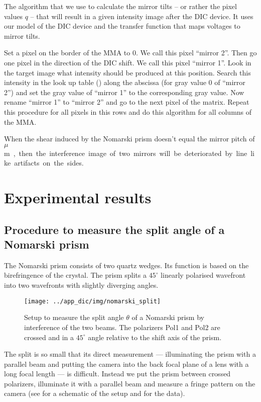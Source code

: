 The algorithm that we use to calculate the mirror tilts -- or rather
the pixel values $q$ -- that will result in a given intensity image
after the DIC device. It uses our model of the DIC device and the
transfer function that maps voltages to mirror tilts.

Set a pixel on the border of the MMA to 0. We call this pixel ``mirror
2''. Then go one pixel in the direction of the DIC shift. We call this
pixel ``mirror 1''. Look in the target image what intensity should be
produced at this position. Search this intensity in the look up table
() along the abscissa (for gray value 0 of
``mirror 2'') and set the gray value of ``mirror 1'' to the
corresponding gray value. Now rename ``mirror 1'' to ``mirror 2'' and
go to the next pixel of the matrix. Repeat this procedure for all
pixels in this rows and do this algorithm for all columns of the MMA.

When the shear induced by the Nomarski prism doesn't equal the mirror
pitch of \unit[16]{$\mu$m}, then the interference image of two
mirrors will be deteriorated by line like artifacts on the sides.

\section{Experimental results}
\subsection{Procedure to measure the split angle of a Nomarski prism}
\label{sec:prism}
The Nomarski prism consists of two quartz wedges. Its function is
based on the birefringence of the crystal. The prism splits a
$45^\circ$ linearly polarised wavefront into two wavefronts with
slightly diverging angles.
\begin{figure}[htb]
  \centering
  \texttt{[image: ../app\_dic/img/nomarski\_split]}
  \caption{Setup to measure the split angle $\theta$ of a Nomarski
    prism by interference of the two beams. The polarizers Pol1 and
    Pol2 are crossed and in a $45^\circ$ angle relative to the shift
    axis of the prism.}
  \label{fig:nomarski_split}
\end{figure}
The split is so small that its direct measurement --- illuminating the
prism with a parallel beam and putting the camera into the back focal
plane of a lens with a long focal length --- is difficult.  Instead we
put the prism between crossed polarizers, illuminate it with a
parallel beam and measure a fringe pattern on the camera (see
 for a schematic of the setup and
 for the data).

